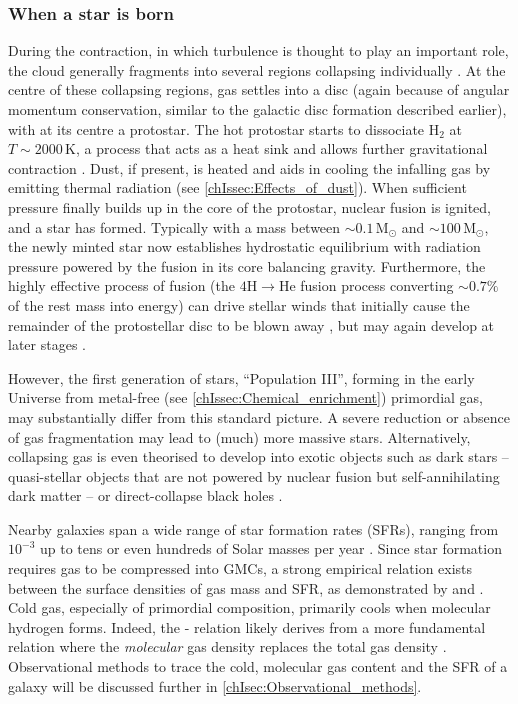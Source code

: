 \subsubsection{When a star is born}
\label{chIsssec:When_a_star_is_born}

During the contraction, in which turbulence is thought to play an important role, the cloud generally fragments into several regions collapsing individually \citep[e.g.][]{2007ARA&A..45..565M}. At the centre of these collapsing regions, gas settles into a disc (again because of angular momentum conservation, similar to the galactic disc formation described earlier), with at its centre a protostar. The hot protostar starts to dissociate $\text{H}_2$ at $T \sim 2000 \, \mathrm{K}$, a process that acts as a heat sink and allows further gravitational contraction \citep{2010gfe..book.....M}. Dust, if present, is heated and aids in cooling the infalling gas by emitting thermal radiation (see \cref{chIssec:Effects_of_dust}). When sufficient pressure finally builds up in the core of the protostar, nuclear fusion is ignited, and a star has formed. Typically with a mass between $\sim 0.1 \, \mathrm{M_\odot}$ and $\sim 100 \, \mathrm{M_\odot}$, the newly minted star now establishes hydrostatic equilibrium with radiation pressure powered by the fusion in its core balancing gravity. Furthermore, the highly effective process of fusion (the $4\text{H} \rightarrow \text{He}$ fusion process converting $\sim 0.7\%$ of the rest mass into energy) can drive stellar winds that initially cause the remainder of the protostellar disc to be blown away \citep{2007ARA&A..45..565M}, but may again develop at later stages \citep{1999isw..book.....L}.

However, the first generation of stars, ``Population III'', forming in the early Universe from metal-free (see \cref{chIssec:Chemical_enrichment}) primordial gas, may substantially differ from this standard picture. A severe reduction or absence of gas fragmentation may lead to (much) more massive stars. Alternatively, collapsing gas is even theorised to develop into exotic objects such as dark stars -- quasi-stellar objects that are not powered by nuclear fusion but self-annihilating dark matter -- or direct-collapse black holes \citep{2013RPPh...76k2901B}.

Nearby galaxies span a wide range of star formation rates (SFRs), ranging from $10^{-3}$ up to tens or even hundreds of Solar masses per year \citep{2012ARA&A..50..531K}. Since star formation requires gas to be compressed into GMCs, a strong empirical relation exists between the surface densities of gas mass and SFR, as demonstrated by \citet{1959ApJ...129..243S} and \citet{1989ApJ...344..685K, 1998ApJ...498..541K}. Cold gas, especially of primordial composition, primarily cools when molecular hydrogen forms. Indeed, the \citeauthor{1959ApJ...129..243S}-\citeauthor{1989ApJ...344..685K} relation likely derives from a more fundamental relation where the \textit{molecular} gas density replaces the total gas density \citep[e.g.][]{2022MNRAS.510.3622B}. Observational methods to trace the cold, molecular gas content and the SFR of a galaxy will be discussed further in \cref{chIsec:Observational_methods}.

